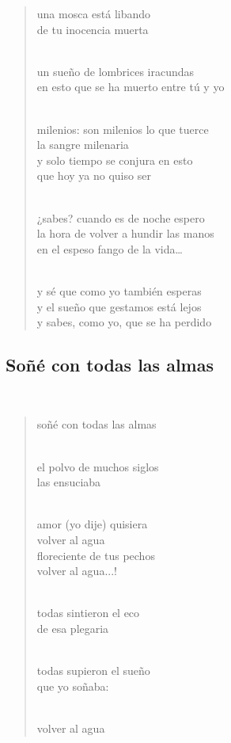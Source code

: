 \documentclass[a4paper, 12pt]{article}
\begin{document}
\begin{verse}
    
una mosca está libando\\
de tu inocencia muerta\\
~ 

un sueño de lombrices iracundas\\
en esto que se ha muerto entre tú y yo\\
~

milenios: son milenios lo que tuerce\\
la sangre milenaria\\
y solo tiempo se conjura en esto\\
que hoy ya no quiso ser\\
~ 

¿sabes? cuando es de noche espero\\
la hora de volver a hundir las manos\\
en el espeso fango de la vida…\\
~ 

y sé que como yo también esperas\\
y el sueño que gestamos está lejos\\
y sabes, como yo, que se ha perdido\\
\end{verse}

\pagebreak
\subsection{Soñé con todas las almas}
~ 

\begin{verse}
soñé con todas las almas\\
~

el polvo de muchos siglos\\
las ensuciaba\\
~

amor (yo dije) quisiera\\
volver al agua\\
floreciente de tus pechos\\
volver al agua...!\\
~

todas sintieron el eco\\
de esa plegaria\\
~

todas supieron el sueño\\
que yo soñaba:\\
~

volver al agua\\
\end{verse}
\end{document}
